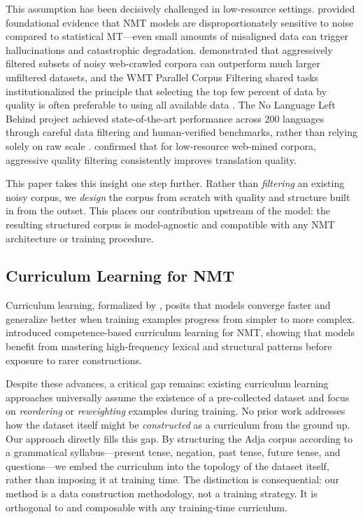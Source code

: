 \documentclass[11pt]{article}
\begin{document}
This assumption has been decisively challenged in low-resource settings. \citet{khayrallah-koehn-2018-impact} provided foundational evidence that NMT models are disproportionately sensitive to noise compared to statistical MT---even small amounts of misaligned data can trigger hallucinations and catastrophic degradation. \citet{junczys-dowmunt-2018-dual} demonstrated that aggressively filtered subsets of noisy web-crawled corpora can outperform much larger unfiltered datasets, and the WMT Parallel Corpus Filtering shared tasks institutionalized the principle that selecting the top few percent of data by quality is often preferable to using all available data \citep{koehn-etal-2019-findings}. The No Language Left Behind project achieved state-of-the-art performance across 200 languages through careful data filtering and human-verified benchmarks, rather than relying solely on raw scale \citep{nllbteam2022languageleftbehindscaling}. \citet{ranathunga2024improving} confirmed that for low-resource web-mined corpora, aggressive quality filtering consistently improves translation quality.

This paper takes this insight one step further. Rather than \emph{filtering} an existing noisy corpus, we \emph{design} the corpus from scratch with quality and structure built in from the outset. This places our contribution upstream of the model: the resulting structured corpus is model-agnostic and compatible with any NMT architecture or training procedure.

\subsection{Curriculum Learning for NMT}

Curriculum learning, formalized by \citet{bengioetal}, posits that models converge faster and generalize better when training examples progress from simpler to more complex. \citet{platanios2019competencebasedcurriculumlearningneural} introduced competence-based curriculum learning for NMT, showing that models benefit from mastering high-frequency lexical and structural patterns before exposure to rarer constructions. 

Despite these advances, a critical gap remains: existing curriculum learning approaches universally assume the existence of a pre-collected dataset and focus on \emph{reordering} or \emph{reweighting} examples during training. No prior work addresses how the dataset itself might be \emph{constructed} as a curriculum from the ground up. Our approach directly fills this gap. By structuring the Adja corpus according to a grammatical syllabus---present tense, negation, past tense, future tense, and questions---we embed the curriculum into the topology of the dataset itself, rather than imposing it at training time. The distinction is consequential: our method is a data construction methodology, not a training strategy. It is orthogonal to and composable with any training-time curriculum.
\end{document}
